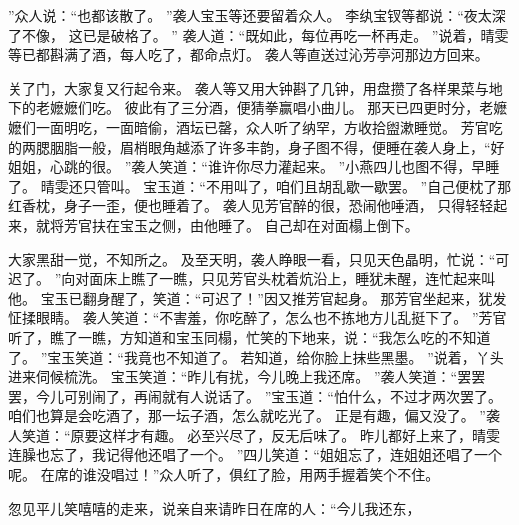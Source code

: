 ”众人说：“也都该散了。
”袭人宝玉等还要留着众人。
李纨宝钗等都说：“夜太深了不像，
这已是破格了。
”
袭人道：“既如此，每位再吃一杯再走。
”说着，晴雯等已都斟满了酒，每人吃了，都命点灯。
袭人等直送过沁芳亭河那边方回来。
\par
关了门，大家复又行起令来。
袭人等又用大钟斟了几钟，用盘攒了各样果菜与地下的老嬷嬷们吃。
彼此有了三分酒，便猜拳赢唱小曲儿。
那天已四更时分，老嬷嬷们一面明吃，一面暗偷，酒坛已罄，众人听了纳罕，方收拾盥漱睡觉。
芳官吃的两腮胭脂一般，眉梢眼角越添了许多丰韵，身子图不得，便睡在袭人身上，“好姐姐，心跳的很。
”袭人笑道：“谁许你尽力灌起来。
”小燕四儿也图不得，早睡了。
晴雯还只管叫。
宝玉道：“不用叫了，咱们且胡乱歇一歇罢。
”自己便枕了那红香枕，身子一歪，便也睡着了。
袭人见芳官醉的很，恐闹他唾酒，
只得轻轻起来，就将芳官扶在宝玉之侧，由他睡了。
自己却在对面榻上倒下。
\par
大家黑甜一觉，不知所之。
及至天明，袭人睁眼一看，只见天色晶明，忙说：“可迟了。
”向对面床上瞧了一瞧，只见芳官头枕着炕沿上，睡犹未醒，连忙起来叫他。
宝玉已翻身醒了，笑道：“可迟了！”因又推芳官起身。
那芳官坐起来，犹发怔揉眼睛。
袭人笑道：“不害羞，你吃醉了，怎么也不拣地方儿乱挺下了。
”芳官听了，瞧了一瞧，方知道和宝玉同榻，忙笑的下地来，说：“我怎么吃的不知道了。
”宝玉笑道：“我竟也不知道了。
若知道，给你脸上抹些黑墨。
”说着，丫头进来伺候梳洗。
宝玉笑道：“昨儿有扰，今儿晚上我还席。
”袭人笑道：“罢罢罢，今儿可别闹了，再闹就有人说话了。
”宝玉道：“怕什么，不过才两次罢了。
咱们也算是会吃酒了，那一坛子酒，怎么就吃光了。
正是有趣，偏又没了。
”袭人笑道：“原要这样才有趣。
必至兴尽了，反无后味了。
昨儿都好上来了，晴雯连臊也忘了，我记得他还唱了一个。
”四儿笑道：“姐姐忘了，连姐姐还唱了一个呢。
在席的谁没唱过！”众人听了，俱红了脸，用两手握着笑个不住。
\par
忽见平儿笑嘻嘻的走来，说亲自来请昨日在席的人：“今儿我还东，
